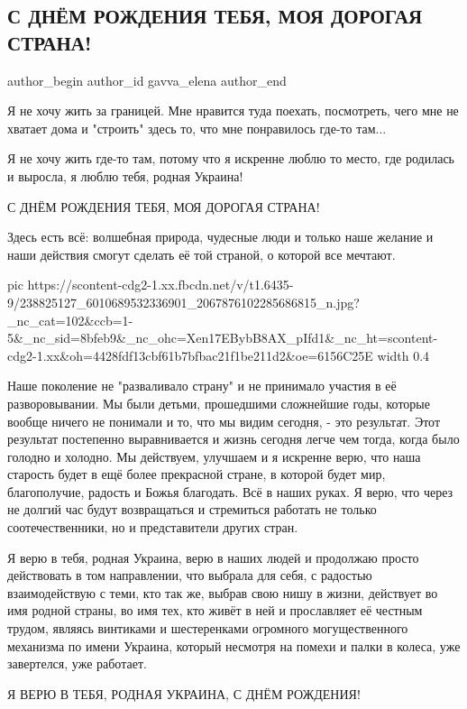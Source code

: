  
 
 
 
 
 
\subsection{С ДНЁМ РОЖДЕНИЯ ТЕБЯ, МОЯ ДОРОГАЯ СТРАНА!}
\label{sec:24_08_2021.fb.gavva_elena.1.nezalezhnist_strana}
 
\ifcmt
 author_begin
   author_id gavva_elena
 author_end
\fi

Я не хочу жить за границей. Мне нравится туда поехать, посмотреть, чего мне не
хватает дома и "строить" здесь то, что мне понравилось где-то там...

Я не хочу жить где-то там, потому что я искренне люблю то место, где родилась и
выросла, я люблю тебя, родная Украина!

С ДНЁМ РОЖДЕНИЯ ТЕБЯ, МОЯ ДОРОГАЯ СТРАНА!

Здесь есть всё: волшебная природа, чудесные люди и только наше желание и наши
действия смогут сделать её той страной, о которой все мечтают.

\ifcmt
  pic https://scontent-cdg2-1.xx.fbcdn.net/v/t1.6435-9/238825127_6010689532336901_2067876102285686815_n.jpg?_nc_cat=102&ccb=1-5&_nc_sid=8bfeb9&_nc_ohc=Xen17EBybB8AX_pIfd1&_nc_ht=scontent-cdg2-1.xx&oh=4428fdf13cbf61b7bfbac21f1be211d2&oe=6156C25E
  width 0.4
\fi

Наше поколение не "разваливало страну" и не принимало участия в её
разворовывании. Мы были детьми, прошедшими сложнейшие годы, которые вообще
ничего не понимали и то, что мы видим сегодня, - это результат. Этот результат
постепенно выравнивается и жизнь сегодня легче чем тогда, когда было голодно и
холодно. Мы действуем, улучшаем и я искренне верю, что наша старость будет в
ещё более прекрасной стране, в которой будет мир, благополучие, радость и Божья
благодать. Всё в наших руках. Я верю, что через не долгий час будут
возвращаться и стремиться работать не только соотечественники, но и
представители других стран. 

Я верю в тебя, родная Украина, верю в наших людей и продолжаю просто
действовать в том направлении, что выбрала для себя, с радостью взаимодействую
с теми, кто так же, выбрав свою нишу в жизни, действует во имя родной страны,
во имя тех, кто живёт в ней и прославляет её честным трудом, являясь винтиками
и шестеренками огромного могущественного механизма по имени Украина, который
несмотря на помехи и палки в колеса, уже завертелся, уже работает.

Я ВЕРЮ В ТЕБЯ, РОДНАЯ УКРАИНА, С ДНЁМ РОЖДЕНИЯ!
